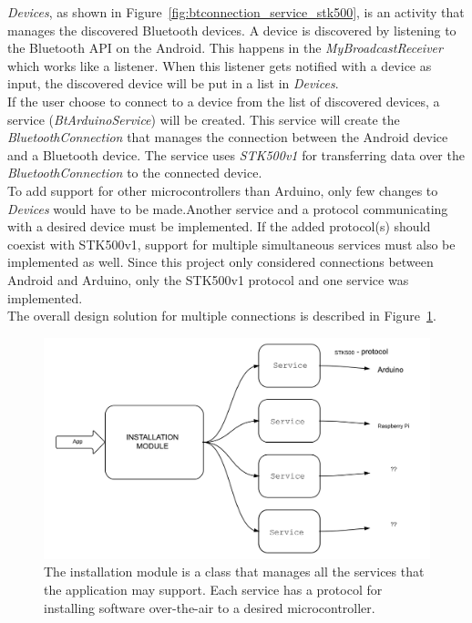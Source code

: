 	\textit{Devices}, as shown in Figure~\ref{fig:btconnection_service_stk500}, is an activity that manages the discovered Bluetooth devices. A device is discovered by listening to the Bluetooth API on the Android. This happens in the \textit{MyBroadcastReceiver} which works like a listener. When this listener gets notified with a device as input, the discovered device will be put in a list in \textit{Devices}.\\

	If the user choose to connect to a device from the list of discovered devices, a service (\textit{BtArduinoService}) will be created. This service will create the \textit{BluetoothConnection} that manages the connection between the Android device and a Bluetooth device. The service uses \textit{STK500v1} for transferring data over the \textit{BluetoothConnection} to the connected device.\\

	To add support for other microcontrollers than Arduino, only few changes to \textit{Devices} would have to be made.Another service and a protocol communicating with a desired device must be implemented. If the added protocol(s) should coexist with STK500v1, support for multiple simultaneous services must also be implemented as well. Since this project only considered connections between Android and Arduino, only the STK500v1 protocol and one service was implemented.\\

	The overall design solution for multiple connections is described in Figure~\ref{fig:otaarchitecture}.\\
	\begin{figure}[H]
	\includegraphics[scale=0.7]{figures/OTAArchitecture.pdf}
	\caption[Over The Air Architecture]{The installation module is a class that manages all the services that the application may support. Each service has a protocol for installing software over-the-air to a desired microcontroller.}
	\label{fig:otaarchitecture}
	\end{figure}

